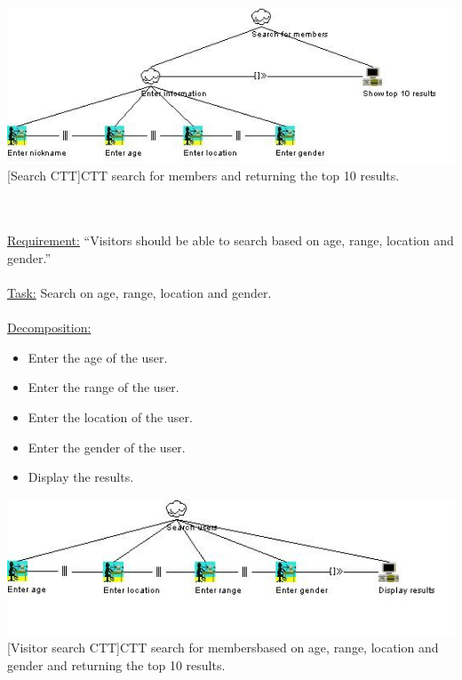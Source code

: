 \documentclass[11pt, a4paper,svglistings,oneside]{book}
\begin{document}
\noindent\begin{minipage}{\textwidth}
    \centering
   \includegraphics[width=\textwidth]{CTT_Search.png}
 [Search CTT]{CTT search for members and returning the top 10 results.}
\end{minipage}
$\;$ \\ \\
\underline{Requirement:} ``Visitors should be able to search based on age, range, location and gender.'' \\ \\
\underline{Task:} Search on age, range, location and gender. \\ \\
\underline{Decomposition:}
\begin{itemize}
\item Enter the age of the user.
\item Enter the range of the user.
\item Enter the location of the user.
\item Enter the gender of the user.
\item Display the results.
\end{itemize}
\noindent\begin{minipage}{\textwidth}
    \centering
   \includegraphics[width=\textwidth]{CTT_Search_2.png}
 [Visitor search CTT]{CTT search for membersbased on age, range, location and gender and returning the top 10 results.}
\end{minipage}
$\;$ \\ \\
\end{document}
